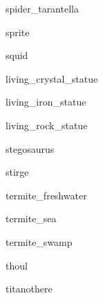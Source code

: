 \documentclass[letterpaper,serif]{module}
\begin{document}
\begin{newmonster}{spider_tarantella}\end{newmonster}

\begin{newmonster}{sprite}\end{newmonster}

\begin{newmonster}{squid}\end{newmonster}

\begin{newmonster}{living_crystal_statue}\end{newmonster}

\begin{newmonster}{living_iron_statue}\end{newmonster}

\begin{newmonster}{living_rock_statue}\end{newmonster}

\begin{newmonster}{stegosaurus}\end{newmonster}

\begin{newmonster}{stirge}\end{newmonster}

\begin{newmonster}{termite_freshwater}\end{newmonster}

\begin{newmonster}{termite_sea}\end{newmonster}

\begin{newmonster}{termite_swamp}\end{newmonster}

\begin{newmonster}{thoul}\end{newmonster}

\begin{newmonster}{titanothere}\end{newmonster}
\end{document}

